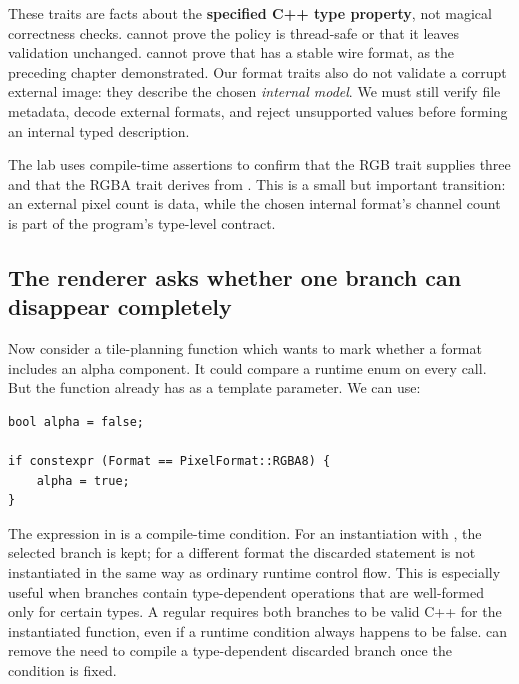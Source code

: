 These traits are facts about the \textbf{specified C++ type property}, not magical correctness checks.  cannot prove the policy is thread-safe or that it leaves validation unchanged.  cannot prove that  has a stable wire format, as the preceding chapter demonstrated. Our format traits also do not validate a corrupt external image: they describe the chosen \emph{internal model}. We must still verify file metadata, decode external formats, and reject unsupported values before forming an internal typed description.

The lab uses compile-time assertions to confirm that the RGB trait supplies three and that the RGBA trait derives from . This is a small but important transition: an external pixel count is data, while the chosen internal format's channel count is part of the program's type-level contract.

\subsection{The renderer asks whether one branch can disappear completely}\label{05-engine-i-ch005-the-renderer-asks-whether-one-branch-can-disappear-completely}

\hypertarget{05-engine-i-ch005-the-renderer-asks-whether-one-branch-can-disappear-completely}{}

Now consider a tile-planning function which wants to mark whether a format includes an alpha component. It could compare a runtime enum on every call. But the function already has  as a template parameter. We can use:

\begin{verbatim}
bool alpha = false;

if constexpr (Format == PixelFormat::RGBA8) {
    alpha = true;
}
\end{verbatim}

The expression in  is a compile-time condition. For an instantiation with , the selected branch is kept; for a different format the discarded statement is not instantiated in the same way as ordinary runtime control flow. This is especially useful when branches contain type-dependent operations that are well-formed only for certain types. A regular  requires both branches to be valid C++ for the instantiated function, even if a runtime condition always happens to be false.  can remove the need to compile a type-dependent discarded branch once the condition is fixed.

